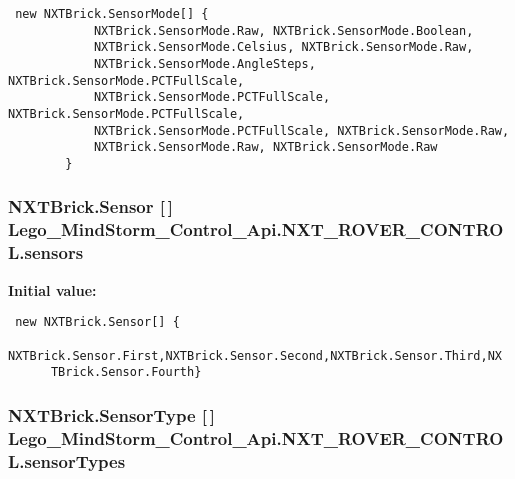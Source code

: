 \begin{Code}\begin{verbatim} new NXTBrick.SensorMode[] {
            NXTBrick.SensorMode.Raw, NXTBrick.SensorMode.Boolean, 
            NXTBrick.SensorMode.Celsius, NXTBrick.SensorMode.Raw,
            NXTBrick.SensorMode.AngleSteps, NXTBrick.SensorMode.PCTFullScale,
            NXTBrick.SensorMode.PCTFullScale, NXTBrick.SensorMode.PCTFullScale,
            NXTBrick.SensorMode.PCTFullScale, NXTBrick.SensorMode.Raw,
            NXTBrick.SensorMode.Raw, NXTBrick.SensorMode.Raw
        }
\end{verbatim}
\end{Code}
\hypertarget{class_lego___mind_storm___control___api_1_1_n_x_t___r_o_v_e_r___c_o_n_t_r_o_l_6e8d4fa3f89e2b26a588297d6442e96c}{
\subsubsection[{sensors}]{\setlength{\rightskip}{0pt plus 5cm}NXTBrick.Sensor \mbox{[}$\,$\mbox{]} {\bf Lego\_\-MindStorm\_\-Control\_\-Api.NXT\_\-ROVER\_\-CONTROL.sensors}}}
\label{class_lego___mind_storm___control___api_1_1_n_x_t___r_o_v_e_r___c_o_n_t_r_o_l_6e8d4fa3f89e2b26a588297d6442e96c}


\textbf{Initial value:}

\begin{Code}\begin{verbatim} new NXTBrick.Sensor[] {
            NXTBrick.Sensor.First,NXTBrick.Sensor.Second,NXTBrick.Sensor.Third,NX
      TBrick.Sensor.Fourth}
\end{verbatim}
\end{Code}
\hypertarget{class_lego___mind_storm___control___api_1_1_n_x_t___r_o_v_e_r___c_o_n_t_r_o_l_6310330ac74f83d63f10da37df46b993}{
\subsubsection[{sensorTypes}]{\setlength{\rightskip}{0pt plus 5cm}NXTBrick.SensorType \mbox{[}$\,$\mbox{]} {\bf Lego\_\-MindStorm\_\-Control\_\-Api.NXT\_\-ROVER\_\-CONTROL.sensorTypes}}}
\label{class_lego___mind_storm___control___api_1_1_n_x_t___r_o_v_e_r___c_o_n_t_r_o_l_6310330ac74f83d63f10da37df46b993}


